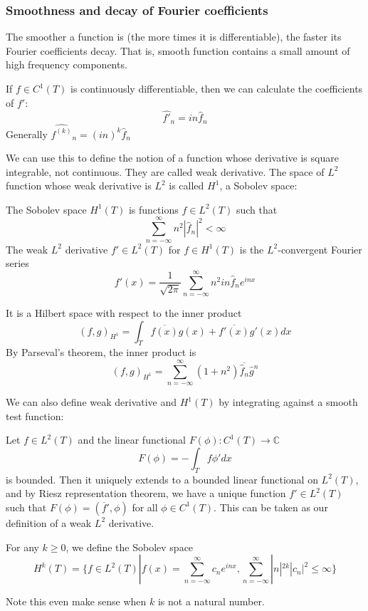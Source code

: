 \documentclass[main.tex]{subfiles}
\begin{document}
\subsubsection{Smoothness and decay of Fourier coefficients}

The smoother a function is (the more times it is differentiable), the faster its Fourier coefficients decay. That is, smooth function contains a small amount of high frequency components.

If $f \in C^1(T)$ is continuously differentiable, then we can calculate the coefficients of $f'$:
$$
\hat{f'}_n = in\hat{f}_n
$$
Generally $\hat{f^{(k)}}_n= (in)^k \hat{f}_n$

We can use this to define the notion of a function whose derivative is square integrable, not continuous. They are called weak derivative. The space of $L^2$ function whose weak derivative is $L^2$ is called $H^1$, a Sobolev space:

\begin{definition}
The Sobolev space $H^1(T)$ is functions $f \in L^2(T)$ such that 
$$
\sum_{n = -\infty} ^{\infty} n^2 |\hat{f}_n|^2 < \infty
$$
The weak $L^2$ derivative $f' \in L^2(T)$ for $f \in H^1(T)$ is the $L^2$-convergent Fourier series
$$
f'(x) = \frac{1}{\sqrt{2\pi}} \sum_{n = -\infty} ^{\infty} n^2 in \hat{f}_n e^{inx}
$$
\end{definition}

It is a Hilbert space with respect to the inner product 
$$
(f, g)_{H^1} = \int_T \overline{f(x)}g(x) + \overline{f'(x)}g'(x) dx
$$
By Parseval's theorem, the inner product is 
$$
(f,g)_{H^1} = \sum_{n = -\infty} ^{\infty} (1 + n^2)\overline{\hat{f}_n} \hat{g}^n
$$

We can also define weak derivative and $H^1(T)$ by integrating against a smooth test function:

Let $f \in L^2(T)$ and the linear functional $F(\phi): C^1(T) \rightarrow \mathbb{C}$
$$
F(\phi) = - \int_T f\phi' dx
$$
is bounded. Then it uniquely extends to a bounded linear functional on $L^2(T)$, and by Riesz representation theorem, we have a unique function $f' \in L^2(T)$ such that $F(\phi) = (\overline{f}', \phi)$ for all $\phi \in C^1(T)$. This can be taken as our definition of a weak $L^2$ derivative.

For any $k \geq 0$, we define the Sobolev space
$$
H^k(T) = \{f \in L^2(T) | f(x) = \sum_{n = -\infty} ^{\infty} c_n e^{inx}, \sum_{n = -\infty} ^{\infty} |n|^{2k}|c_n|^2 \leq \infty \}
$$

Note this even make sense when $k$ is not a natural number.
\end{document}

